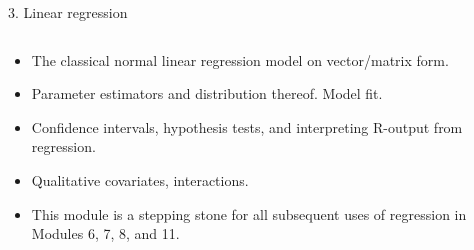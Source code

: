 \documentclass[10pt,ignorenonframetext,]{beamer}
\begin{document}
\begin{frame}

\begin{block}{3. Linear regression}

\(~\)

\begin{itemize}
\item
  The classical normal linear regression model on vector/matrix form.
  \vspace{2mm}
\item
  Parameter estimators and distribution thereof. Model fit. \vspace{2mm}
\item
  Confidence intervals, hypothesis tests, and interpreting R-output from
  regression. \vspace{2mm}
\item
  Qualitative covariates, interactions. \vspace{2mm}
\item
  This module is a stepping stone for all subsequent uses of regression
  in Modules 6, 7, 8, and 11.
\end{itemize}

\end{block}

\end{frame}
\end{document}
